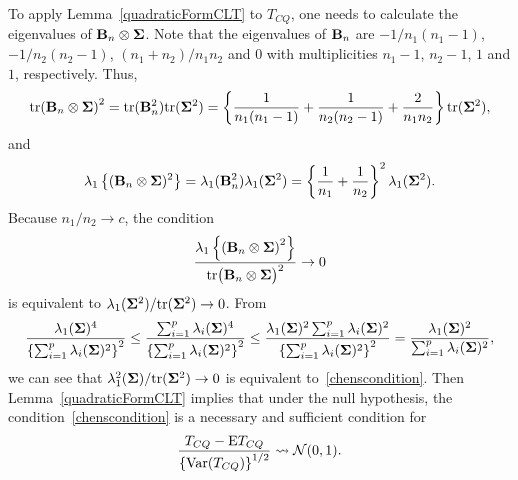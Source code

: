 \documentclass[times,sort&compress,3p]{elsarticle}
\newcommand{\mytr}{ {\rm tr} }
\newcommand{\myE}{ {\rm E} }
\theoremstyle{plain}
\theoremstyle{definition}
\theoremstyle{remark}
\begin{document}
To apply Lemma~\ref{quadraticFormCLT} to $T_{CQ}$, one needs to calculate the eigenvalues of $\mathbf{B}_n\otimes \boldsymbol{\Sigma}$.
Note that the eigenvalues of $\mathbf{B}_n$ are $-1/n_1(n_1-1)$, $-1/n_2(n_2-1)$, $(n_1+n_2)/n_1 n_2$ and $0$ with multiplicities $n_1-1$, $n_2-1$, $1$ and $1$, respectively.
    Thus,
    \begin{equation*}
        \mytr{(\BB_n\otimes \bSigma)}^2=\mytr(\BB_n^2)\mytr(\bSigma^2)=\left\{\frac{1}{n_1(n_1-1)}+\frac{1}{n_2(n_2-1)}+\frac{2}{n_1 n_2}\right\}\mytr (\bSigma^2),
    \end{equation*}
and
    \begin{equation*}
        \lambda_{1}\left\{(\mathbf{B}_n\otimes \boldsymbol{\Sigma})^2\right\}=\lambda_{1}(\mathbf{B}_n^2)\lambda_{1}(\boldsymbol{\Sigma}^2)=\left\{\frac{1}{n_1}+\frac{1}{n_2}\right\}^2\lambda_{1}(\boldsymbol{\Sigma}^2).
    \end{equation*}
    Because $n_1/n_2\to c$, the condition
    $$
    \frac{\lambda_{1}\left\{{(\BB_n\otimes \bSigma)}^2\right\}}{
\mytr{\big(\BB_n\otimes \bSigma\big)}^2}
         \to 0
    $$
    is equivalent to $\lambda_{1}(\bSigma^2)/\mytr (\bSigma^2)\to 0$.
From
$$
\frac{\lambda_1(\boldsymbol{\Sigma})^4}{\left\{\sum_{i=1}^p \lambda_i(\boldsymbol{\Sigma})^2\right\}^2}
\leq
\frac{\sum_{i=1}^p\lambda_i(\boldsymbol{\Sigma})^4}{\left\{\sum_{i=1}^p \lambda_i(\boldsymbol{\Sigma})^2\right\}^2}
\leq
\frac{\lambda_1(\boldsymbol{\Sigma})^2\sum_{i=1}^p\lambda_i(\boldsymbol{\Sigma})^2}{\left\{\sum_{i=1}^p \lambda_i(\boldsymbol{\Sigma})^2\right\}^2}
=
\frac{\lambda_1(\boldsymbol{\Sigma})^2}{\sum_{i=1}^p \lambda_i(\boldsymbol{\Sigma})^2},
$$
    we can see that ${\lambda_{1}^2(\boldsymbol{\Sigma})}/{\mathrm{tr}(\boldsymbol{\Sigma}^2)}\to 0$  is equivalent to~\eqref{chenscondition}.
Then Lemma~\ref{quadraticFormCLT} implies that under the null hypothesis, the condition~\eqref{chenscondition} is a necessary and sufficient condition for 
    \begin{equation*}
        \frac{T_{CQ}-\myE T_{CQ}}{{\left\{\mathrm{Var}(T_{CQ})\right\}}^{1/2}}\rightsquigarrow \mathcal{N}(0,1).
    \end{equation*}
\end{document}
